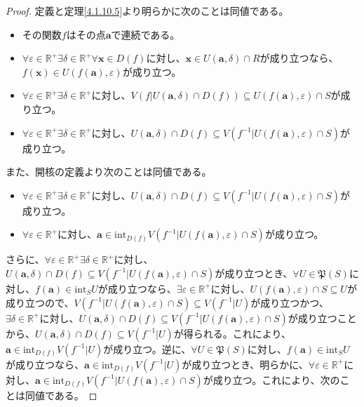\documentclass[dvipdfmx]{jsarticle}
\begin{document}
\begin{proof} 定義と定理\ref{4.1.10.5}より明らかに次のことは同値である。
\begin{itemize}
\item
  その関数$f$はその点$\mathbf{a}$で連続である。
\item
  $\forall\varepsilon \in \mathbb{R}^{+}\exists\delta \in \mathbb{R}^{+}\forall\mathbf{x} \in D(f)$に対し、$\mathbf{x} \in U\left( \mathbf{a},\delta \right) \cap R$が成り立つなら、$f\left( \mathbf{x} \right) \in U\left( f\left( \mathbf{a} \right),\varepsilon \right)$が成り立つ。
\item
  $\forall\varepsilon \in \mathbb{R}^{+}\exists\delta \in \mathbb{R}^{+}$に対し、$V\left( f|U\left( \mathbf{a},\delta \right) \cap D(f) \right) \subseteq U\left( f\left( \mathbf{a} \right),\varepsilon \right) \cap S$が成り立つ。
\item
  $\forall\varepsilon \in \mathbb{R}^{+}\exists\delta \in \mathbb{R}^{+}$に対し、$U\left( \mathbf{a},\delta \right) \cap D(f) \subseteq V\left( f^{- 1}|U\left( f\left( \mathbf{a} \right),\varepsilon \right) \cap S \right)$が成り立つ。
\end{itemize}
また、開核の定義より次のことは同値である。
\begin{itemize}
\item
  $\forall\varepsilon \in \mathbb{R}^{+}\exists\delta \in \mathbb{R}^{+}$に対し、$U\left( \mathbf{a},\delta \right) \cap D(f) \subseteq V\left( f^{- 1}|U\left( f\left( \mathbf{a} \right),\varepsilon \right) \cap S \right)$が成り立つ。
\item
  $\forall\varepsilon \in \mathbb{R}^{+}$に対し、$\mathbf{a} \in \mathrm{int}_{D(f)}{V\left( f^{- 1}|U\left( f\left( \mathbf{a} \right),\varepsilon \right) \cap S \right)}$が成り立つ。
\end{itemize}
さらに、$\forall\varepsilon \in \mathbb{R}^{+}\exists\delta \in \mathbb{R}^{+}$に対し、$U\left( \mathbf{a},\delta \right) \cap D(f) \subseteq V\left( f^{- 1}|U\left( f\left( \mathbf{a} \right),\varepsilon \right) \cap S \right)$が成り立つとき、$\forall U \in \mathfrak{P}(S)$に対し、$f\left( \mathbf{a} \right) \in \mathrm{int}_{S}U$が成り立つなら、$\exists\varepsilon \in \mathbb{R}^{+}$に対し、$U\left( f\left( \mathbf{a} \right),\varepsilon \right) \cap S \subseteq U$が成り立つので、$V\left( f^{- 1}|U\left( f\left( \mathbf{a} \right),\varepsilon \right) \cap S \right) \subseteq V\left( f^{- 1}|U \right)$が成り立つかつ、$\exists\delta \in \mathbb{R}^{+}$に対し、$U\left( \mathbf{a},\delta \right) \cap D(f) \subseteq V\left( f^{- 1}|U\left( f\left( \mathbf{a} \right),\varepsilon \right) \cap S \right)$が成り立つことから、$U\left( \mathbf{a},\delta \right) \cap D(f) \subseteq V\left( f^{- 1}|U \right)$が得られる。これにより、$\mathbf{a} \in \mathrm{int}_{D(f)}{V\left( f^{- 1}|U \right)}$が成り立つ。逆に、$\forall U \in \mathfrak{P}(S)$に対し、$f\left( \mathbf{a} \right) \in \mathrm{int}_{S}U$が成り立つなら、$\mathbf{a} \in \mathrm{int}_{D(f)}{V\left( f^{- 1}|U \right)}$が成り立つとき、明らかに、$\forall\varepsilon \in \mathbb{R}^{+}$に対し、$\mathbf{a} \in \mathrm{int}_{D(f)}{V\left( f^{- 1}|U\left( f\left( \mathbf{a} \right),\varepsilon \right) \cap S \right)}$が成り立つ。これにより、次のことは同値である。

\end{proof}
\end{document}
